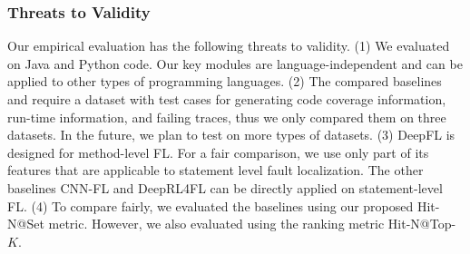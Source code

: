 \subsubsection{Threats to Validity}
Our empirical evaluation has the following threats to validity. (1) We
evaluated {\tool} on Java and Python code. Our key modules are
language-independent and can be applied to other types of programming
languages.  (2) The compared baselines and {\tool} require a dataset
with test cases for generating code coverage information, run-time
information, and failing traces, thus we only compared them on three
datasets. In the future, we plan to test {\tool} on more types of
datasets. (3) DeepFL is designed for method-level FL. For a fair
comparison, we use only part of its features that are applicable to
statement level fault localization. The other baselines CNN-FL and
DeepRL4FL can be directly applied on statement-level FL. (4) To
compare fairly, we evaluated the baselines using our proposed
Hit-N@Set metric. However, we also evaluated {\tool} using the ranking
metric Hit-N@Top-$K$.



